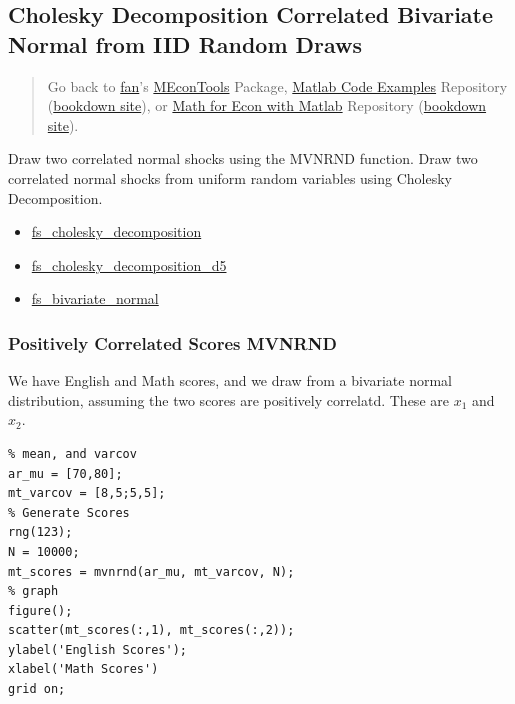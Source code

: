 \documentclass[
]{book}
\begin{document}
\hypertarget{cholesky-decomposition-correlated-bivariate-normal-from-iid-random-draws}{%
\subsection{Cholesky Decomposition Correlated Bivariate Normal from IID Random Draws}\label{cholesky-decomposition-correlated-bivariate-normal-from-iid-random-draws}}

\begin{quote}
Go back to \href{http://fanwangecon.github.io/}{fan}'s \href{https://fanwangecon.github.io/MEconTools/}{MEconTools} Package, \href{https://fanwangecon.github.io/M4Econ/}{Matlab Code Examples} Repository (\href{https://fanwangecon.github.io/M4Econ/bookdown}{bookdown site}), or \href{https://fanwangecon.github.io/Math4Econ/}{Math for Econ with Matlab} Repository (\href{https://fanwangecon.github.io/Math4Econ/bookdown}{bookdown site}).
\end{quote}

Draw two correlated normal shocks using the MVNRND function. Draw two
correlated normal shocks from uniform random variables using Cholesky
Decomposition.

\begin{itemize}
\item
  \href{https://fanwangecon.github.io/M4Econ/simulation/normal/htmlpdfm/fs_cholesky_decomposition.html}{fs\_cholesky\_decomposition}
\item
  \href{https://fanwangecon.github.io/M4Econ/simulation/normal/htmlpdfm/fs_cholesky_decomposition_d5.html}{fs\_cholesky\_decomposition\_d5}
\item
  \href{https://fanwangecon.github.io/M4Econ/simulation/normal/htmlpdfm/fs_bivariate_normal.html}{fs\_bivariate\_normal}
\end{itemize}

\hypertarget{positively-correlated-scores-mvnrnd}{%
\subsubsection{Positively Correlated Scores MVNRND}\label{positively-correlated-scores-mvnrnd}}

We have English and Math scores, and we draw from a bivariate normal
distribution, assuming the two scores are positively correlatd. These
are \(x_1\) and \(x_2\).

\begin{verbatim}
% mean, and varcov
ar_mu = [70,80];
mt_varcov = [8,5;5,5];
% Generate Scores
rng(123);
N = 10000;
mt_scores = mvnrnd(ar_mu, mt_varcov, N);
% graph
figure();
scatter(mt_scores(:,1), mt_scores(:,2));
ylabel('English Scores');
xlabel('Math Scores')
grid on;
\end{verbatim}
\end{document}
